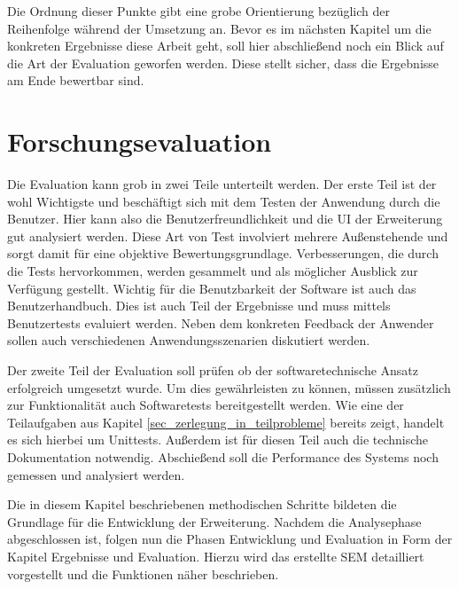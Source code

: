Die Ordnung dieser Punkte gibt eine grobe Orientierung bezüglich der Reihenfolge
während der Umsetzung an. Bevor es im nächsten Kapitel um die konkreten Ergebnisse
diese Arbeit geht, soll hier abschließend noch ein Blick auf die Art der
Evaluation geworfen werden. Diese stellt sicher, dass die Ergebnisse am Ende
bewertbar sind.

\section{Forschungsevaluation}
Die Evaluation kann grob in zwei Teile unterteilt werden. Der erste Teil ist der
wohl Wichtigste und beschäftigt sich mit dem Testen der Anwendung durch die Benutzer.
Hier kann also die Benutzerfreundlichkeit und die \ac{UI} der Erweiterung gut analysiert
werden. Diese Art von Test involviert mehrere Außenstehende und sorgt damit für
eine objektive Bewertungsgrundlage. Verbesserungen, die durch die Tests
hervorkommen, werden gesammelt und als möglicher Ausblick zur Verfügung gestellt.
Wichtig für die Benutzbarkeit der Software ist auch das Benutzerhandbuch. Dies ist
auch Teil der Ergebnisse und muss mittels Benutzertests evaluiert werden. Neben
dem konkreten Feedback der Anwender sollen auch verschiedenen
Anwendungsszenarien diskutiert werden.

Der zweite Teil der Evaluation soll prüfen ob der softwaretechnische Ansatz
erfolgreich umgesetzt wurde. Um dies gewährleisten zu können, müssen zusätzlich
zur Funktionalität auch Softwaretests bereitgestellt werden. Wie eine der Teilaufgaben
aus Kapitel \ref{sec_zerlegung_in_teilprobleme} bereits zeigt, handelt es sich
hierbei um Unittests. Außerdem ist für diesen Teil auch die technische Dokumentation
notwendig. Abschießend soll die Performance des Systems noch gemessen und
analysiert werden.

Die in diesem Kapitel beschriebenen methodischen Schritte bildeten die Grundlage
für die Entwicklung der Erweiterung. Nachdem die Analysephase abgeschlossen ist,
folgen nun die Phasen Entwicklung und Evaluation in Form der Kapitel Ergebnisse
und Evaluation. Hierzu wird das erstellte \ac{SEM} detailliert vorgestellt und
die Funktionen näher beschrieben.
